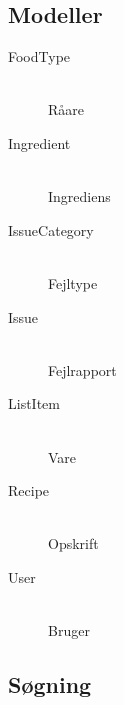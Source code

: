 \subsection{Modeller}

\begin{description}

\item[FoodType] \hfill \\
Råare

\item[Ingredient] \hfill \\
Ingrediens

\item[IssueCategory] \hfill \\
Fejltype

\item[Issue] \hfill \\
Fejlrapport

\item[ListItem] \hfill \\
Vare

\item[Recipe] \hfill \\
Opskrift

\item[User] \hfill \\
Bruger

\end{description}

\subsection{Søgning}
\label{sec:soegning}



